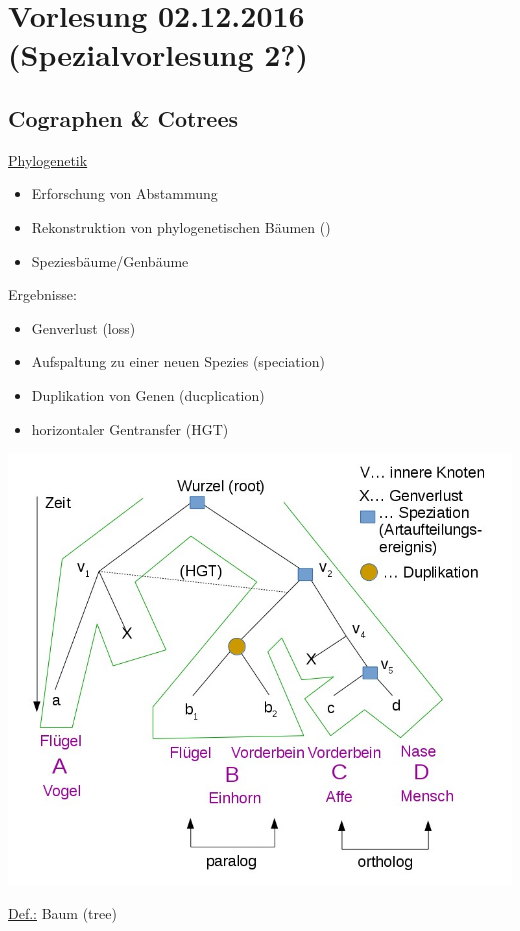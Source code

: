 \section{Vorlesung 02.12.2016 (Spezialvorlesung 2?)}

\subsection{Cographen \& Cotrees}
\underline{Phylogenetik}
\begin{itemize}
    \item Erforschung von Abstammung
    \item Rekonstruktion von phylogenetischen Bäumen (\grqq )
    \item Speziesbäume/Genbäume
\end{itemize}    
Ergebnisse:
\begin{itemize}
    \item Genverlust (loss)
    \item Aufspaltung zu einer neuen Spezies (speciation)
    \item Duplikation von Genen (ducplication)
    \item horizontaler Gentransfer (HGT)
\end{itemize}
\begin{center}
\includegraphics[scale=0.5]{lectures/161202/pix/01.jpg}
\end{center}
\par\medskip
\underline{Def.:} Baum (tree)
